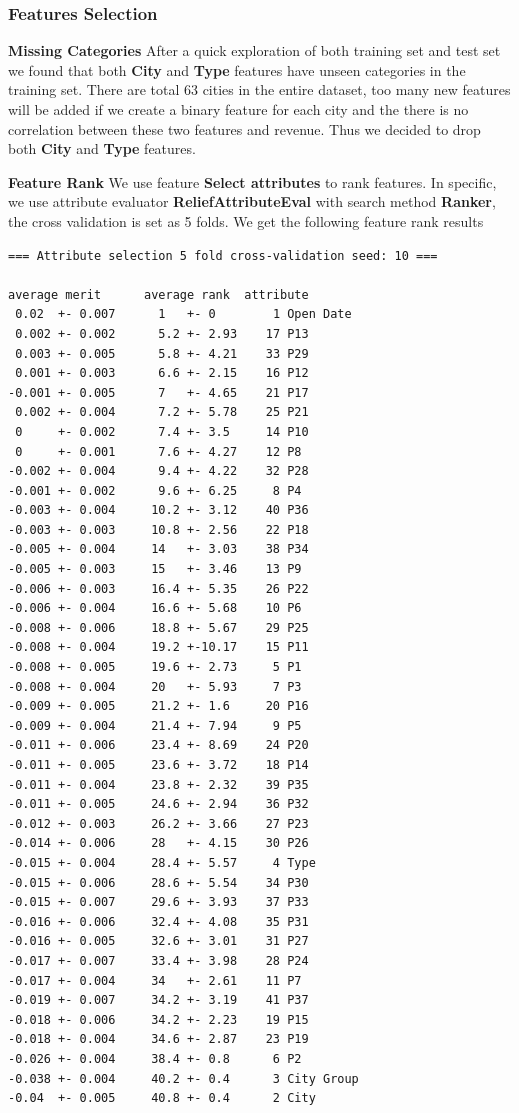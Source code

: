 \documentclass[10pt, oneside]{article}   	%
\begin{document}
\subsubsection{Features Selection}

{\bf Missing Categories} 
After a quick exploration of both training set and test set we found that both {\bf City} and {\bf Type} features have unseen categories in the training set.
There are total 63 cities in the entire dataset, too many new features will be added if we create a binary feature for each city and 
the there is no correlation between these two features and revenue.
Thus we decided to drop both {\bf City} and {\bf Type} features.

{\bf Feature Rank}
We use feature \textbf{Select attributes} to rank features. In specific, we use attribute evaluator \textbf{ReliefAttributeEval} with search method \textbf{Ranker}, the cross validation is set as 5 folds. We get the following feature rank results

{\scriptsize
\begin{verbatim}
=== Attribute selection 5 fold cross-validation seed: 10 ===

average merit      average rank  attribute
 0.02  +- 0.007      1   +- 0        1 Open Date
 0.002 +- 0.002      5.2 +- 2.93    17 P13
 0.003 +- 0.005      5.8 +- 4.21    33 P29
 0.001 +- 0.003      6.6 +- 2.15    16 P12
-0.001 +- 0.005      7   +- 4.65    21 P17
 0.002 +- 0.004      7.2 +- 5.78    25 P21
 0     +- 0.002      7.4 +- 3.5     14 P10
 0     +- 0.001      7.6 +- 4.27    12 P8
-0.002 +- 0.004      9.4 +- 4.22    32 P28
-0.001 +- 0.002      9.6 +- 6.25     8 P4
-0.003 +- 0.004     10.2 +- 3.12    40 P36
-0.003 +- 0.003     10.8 +- 2.56    22 P18
-0.005 +- 0.004     14   +- 3.03    38 P34
-0.005 +- 0.003     15   +- 3.46    13 P9
-0.006 +- 0.003     16.4 +- 5.35    26 P22
-0.006 +- 0.004     16.6 +- 5.68    10 P6
-0.008 +- 0.006     18.8 +- 5.67    29 P25
-0.008 +- 0.004     19.2 +-10.17    15 P11
-0.008 +- 0.005     19.6 +- 2.73     5 P1
-0.008 +- 0.004     20   +- 5.93     7 P3
-0.009 +- 0.005     21.2 +- 1.6     20 P16
-0.009 +- 0.004     21.4 +- 7.94     9 P5
-0.011 +- 0.006     23.4 +- 8.69    24 P20
-0.011 +- 0.005     23.6 +- 3.72    18 P14
-0.011 +- 0.004     23.8 +- 2.32    39 P35
-0.011 +- 0.005     24.6 +- 2.94    36 P32
-0.012 +- 0.003     26.2 +- 3.66    27 P23
-0.014 +- 0.006     28   +- 4.15    30 P26
-0.015 +- 0.004     28.4 +- 5.57     4 Type
-0.015 +- 0.006     28.6 +- 5.54    34 P30
-0.015 +- 0.007     29.6 +- 3.93    37 P33
-0.016 +- 0.006     32.4 +- 4.08    35 P31
-0.016 +- 0.005     32.6 +- 3.01    31 P27
-0.017 +- 0.007     33.4 +- 3.98    28 P24
-0.017 +- 0.004     34   +- 2.61    11 P7
-0.019 +- 0.007     34.2 +- 3.19    41 P37
-0.018 +- 0.006     34.2 +- 2.23    19 P15
-0.018 +- 0.004     34.6 +- 2.87    23 P19
-0.026 +- 0.004     38.4 +- 0.8      6 P2
-0.038 +- 0.004     40.2 +- 0.4      3 City Group
-0.04  +- 0.005     40.8 +- 0.4      2 City
 \end{verbatim}
}
\end{document}
